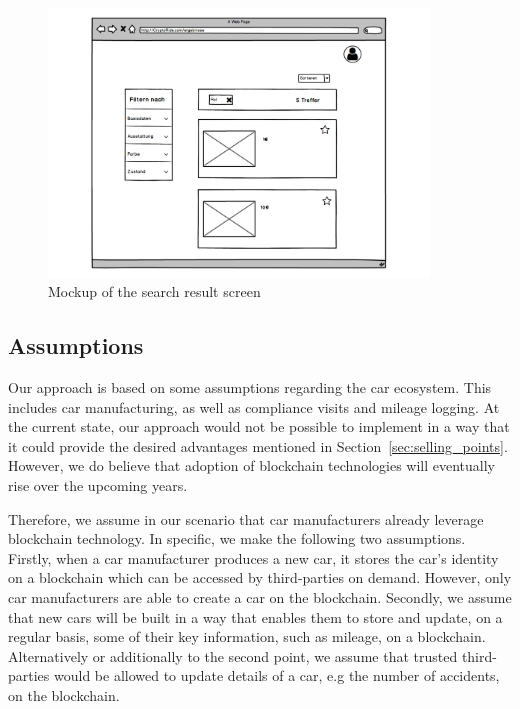 \begin{figure}[htbp]
\centerline{\includegraphics[width=0.9\textwidth]{figures/mockup_screen_02.pdf}}
\caption{Mockup of the search result screen \label{fig:mockup_02}}
\end{figure}


\subsection{Assumptions}\label{concept:assumptions}

Our approach is based on some assumptions regarding the car ecosystem. This includes car manufacturing, as well as compliance visits and mileage logging. At the current state, our approach would not be possible to implement in a way that it could provide the desired advantages mentioned in Section~\ref{sec:selling_points}. However, we do believe that adoption of blockchain technologies will eventually rise over the upcoming years.

Therefore, we assume in our scenario that car manufacturers already leverage blockchain technology. In specific, we make the following two assumptions. Firstly, when a car manufacturer produces a new car, it stores the car's identity on a blockchain which can be accessed by third-parties on demand. However, only car manufacturers are able to create a car on the blockchain. Secondly, we assume that new cars will be built in a way that enables them to store and update, on a regular basis, some of their key information, such as mileage, on a blockchain. Alternatively or additionally to the second point, we assume that trusted third-parties would be allowed to update details of a car, e.g the number of accidents, on the blockchain.
